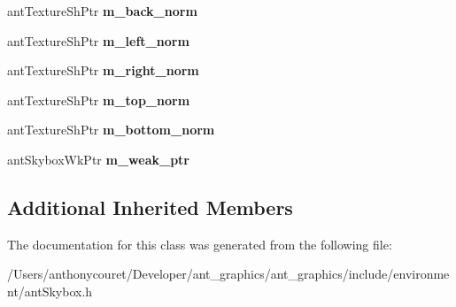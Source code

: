 \begin{DoxyCompactItemize}
\item 
\hypertarget{classant_skybox_ab97c9db7a5daf60c779baf0a4830edc4}{ant\+Texture\+Sh\+Ptr {\bfseries m\+\_\+back\+\_\+norm}}\label{classant_skybox_ab97c9db7a5daf60c779baf0a4830edc4}

\item 
\hypertarget{classant_skybox_af8595eaa31f3499bf47b8774284d159a}{ant\+Texture\+Sh\+Ptr {\bfseries m\+\_\+left\+\_\+norm}}\label{classant_skybox_af8595eaa31f3499bf47b8774284d159a}

\item 
\hypertarget{classant_skybox_a98189f97cf4f29dc995cfc3cad81cc76}{ant\+Texture\+Sh\+Ptr {\bfseries m\+\_\+right\+\_\+norm}}\label{classant_skybox_a98189f97cf4f29dc995cfc3cad81cc76}

\item 
\hypertarget{classant_skybox_a19b09c73314d82158fafdc5f495ffb1c}{ant\+Texture\+Sh\+Ptr {\bfseries m\+\_\+top\+\_\+norm}}\label{classant_skybox_a19b09c73314d82158fafdc5f495ffb1c}

\item 
\hypertarget{classant_skybox_afe29da29d8b0b8c07771e5afc8116b08}{ant\+Texture\+Sh\+Ptr {\bfseries m\+\_\+bottom\+\_\+norm}}\label{classant_skybox_afe29da29d8b0b8c07771e5afc8116b08}

\item 
\hypertarget{classant_skybox_adafe8d00285291c51861c4309502a8a9}{ant\+Skybox\+Wk\+Ptr {\bfseries m\+\_\+weak\+\_\+ptr}}\label{classant_skybox_adafe8d00285291c51861c4309502a8a9}

\end{DoxyCompactItemize}
\subsection*{Additional Inherited Members}


The documentation for this class was generated from the following file\+:\begin{DoxyCompactItemize}
\item 
/\+Users/anthonycouret/\+Developer/ant\+\_\+graphics/ant\+\_\+graphics/include/environment/ant\+Skybox.\+h\end{DoxyCompactItemize}
